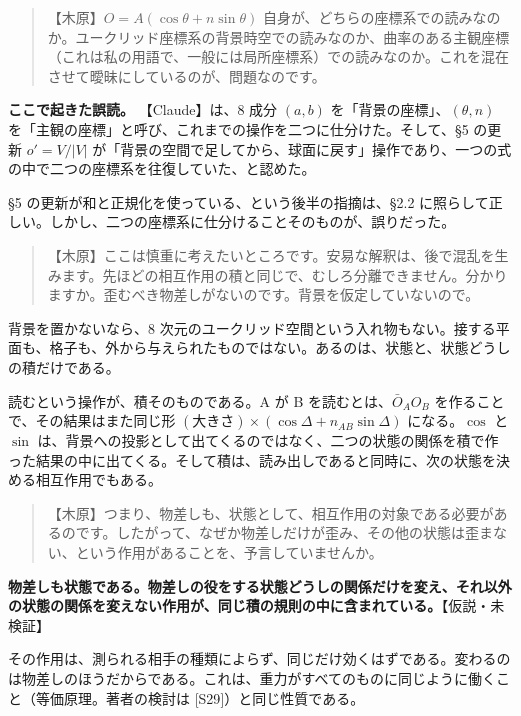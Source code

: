 \documentclass[
  a4paper,
]{ltjsarticle}
\begin{document}
\begin{quote}
【木原】\(O = A(\cos\theta + n\sin\theta)\)
自身が、どちらの座標系での読みなのか。ユークリッド座標系の背景時空での読みなのか、曲率のある主観座標（これは私の用語で、一般には局所座標系）での読みなのか。これを混在させて曖昧にしているのが、問題なのです。
\end{quote}

\textbf{ここで起きた誤読。} 【Claude】は、8 成分 \((a, b)\)
を「背景の座標」、\((\theta, n)\)
を「主観の座標」と呼び、これまでの操作を二つに仕分けた。そして、§5
の更新 \(o' = V/\lvert V\rvert\)
が「背景の空間で足してから、球面に戻す」操作であり、一つの式の中で二つの座標系を往復していた、と認めた。

§5 の更新が和と正規化を使っている、という後半の指摘は、§2.2
に照らして正しい。しかし、二つの座標系に仕分けることそのものが、誤りだった。

\begin{quote}
【木原】ここは慎重に考えたいところです。安易な解釈は、後で混乱を生みます。先ほどの相互作用の積と同じで、むしろ分離できません。分かりますか。歪むべき物差しがないのです。背景を仮定していないので。
\end{quote}

背景を置かないなら、8
次元のユークリッド空間という入れ物もない。接する平面も、格子も、外から与えられたものではない。あるのは、状態と、状態どうしの積だけである。

読むという操作が、積そのものである。A が B を読むとは、\(\bar O_AO_B\)
を作ることで、その結果はまた同じ形
\((\text{大きさ})\times(\cos\Delta + n_{AB}\sin\Delta)\)
になる。\(\cos\) と \(\sin\)
は、背景への投影として出てくるのではなく、二つの状態の関係を積で作った結果の中に出てくる。そして積は、読み出しであると同時に、次の状態を決める相互作用でもある。

\begin{quote}
【木原】つまり、物差しも、状態として、相互作用の対象である必要があるのです。したがって、なぜか物差しだけが歪み、その他の状態は歪まない、という作用があることを、予言していませんか。
\end{quote}

\textbf{物差しも状態である。物差しの役をする状態どうしの関係だけを変え、それ以外の状態の関係を変えない作用が、同じ積の規則の中に含まれている。}【仮説・未検証】

その作用は、測られる相手の種類によらず、同じだけ効くはずである。変わるのは物差しのほうだからである。これは、重力がすべてのものに同じように働くこと（等価原理。著者の検討は
{[}S29{]}）と同じ性質である。
\end{document}
